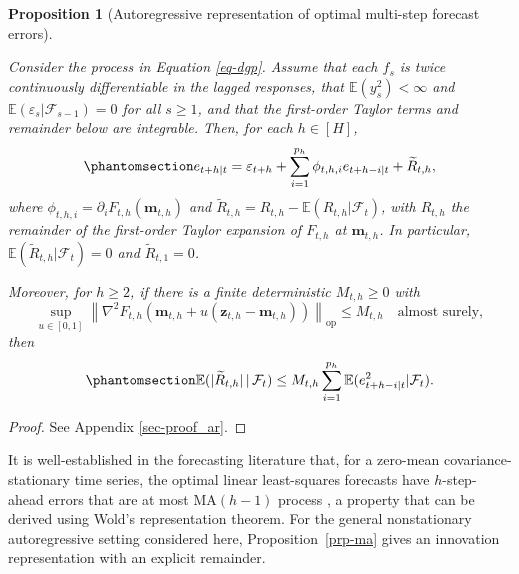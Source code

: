 \documentclass[
  american,
  12pt]{article}
\theoremstyle{plain}
\theoremstyle{plain}
\newtheorem{proposition}{Proposition}[section]
\theoremstyle{remark}
\begin{document}
\begin{proposition}[Autoregressive representation of optimal multi-step
forecast errors]\protect\hypertarget{prp-ar}{}\label{prp-ar}

Consider the process in Equation \eqref{eq-dgp}. Assume that each
\(f_s\) is twice continuously differentiable in the lagged responses,
that \(\mathbb E(y_s^2)<\infty\) and
\(\mathbb E(\varepsilon_s|\mathcal F_{s-1})=0\) for all \(s\geq1\), and
that the first-order Taylor terms and remainder below are integrable.
Then, for each \(h\in[H]\),
\begin{equation}\phantomsection\label{eq-ar}{
e_{t+h|t}
=\varepsilon_{t+h}+\sum_{i=1}^{p_h}\phi_{t,h,i}e_{t+h-i|t}+\widetilde R_{t,h},
}\end{equation} where \(\phi_{t,h,i}=\partial_iF_{t,h}(\bm m_{t,h})\)
and \(\widetilde R_{t,h}=R_{t,h}-\mathbb E(R_{t,h}|\mathcal F_t)\), with
\(R_{t,h}\) the remainder of the first-order Taylor expansion of
\(F_{t,h}\) at \(\bm m_{t,h}\). In particular,
\(\mathbb E(\widetilde R_{t,h}|\mathcal F_t)=0\) and
\(\widetilde R_{t,1}=0\).

Moreover, for \(h\geq2\), if there is a finite deterministic
\(M_{t,h}\geq0\) with \[
\sup_{u\in[0,1]}
\left\|\nabla^2F_{t,h}\!\left(\bm m_{t,h}+u(\bm z_{t,h}-\bm m_{t,h})\right)\right\|_{\mathrm{op}}
\leq M_{t,h}\quad\text{almost surely},
\] then \begin{equation}\phantomsection\label{eq-remainder-bound}{
\mathbb E(|\widetilde R_{t,h}|\,|\,\mathcal F_t)
\leq M_{t,h}\sum_{i=1}^{p_h}\mathbb E(e_{t+h-i|t}^2|\mathcal F_t).
}\end{equation}

\end{proposition}

\begin{proof}
See Appendix \ref{sec-proof_ar}.
\end{proof}

It is well-established in the forecasting literature that, for a
zero-mean covariance-stationary time series, the optimal linear
least-squares forecasts have \(h\)-step-ahead errors that are at most
MA\((h-1)\) process \citep{harvey1997}, a property that can be derived
using Wold's representation theorem. For the general nonstationary
autoregressive setting considered here, Proposition~\ref{prp-ma} gives
an innovation representation with an explicit remainder.
\end{document}
